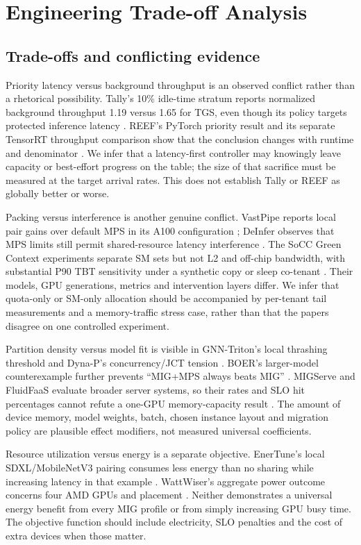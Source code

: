 \documentclass[12pt,a4paper]{article}
\begin{document}
\section{Engineering Trade-off Analysis}
\subsection{Trade-offs and conflicting evidence}
Priority latency versus background throughput is an observed conflict rather than a rhetorical possibility. Tally's 10\% idle-time stratum reports normalized background throughput 1.19 versus 1.65 for TGS, even though its policy targets protected inference latency \cite{tally}. REEF's PyTorch priority result and its separate TensorRT throughput comparison show that the conclusion changes with runtime and denominator \cite{reef}. We infer that a latency-first controller may knowingly leave capacity or best-effort progress on the table; the size of that sacrifice must be measured at the target arrival rates. This does not establish Tally or REEF as globally better or worse.

Packing versus interference is another genuine conflict. VastPipe reports local pair gains over default MPS in its A100 configuration \cite{vastpipe}; DeInfer observes that MPS limits still permit shared-resource latency interference \cite{deinfer}. The SoCC Green Context experiments separate SM sets but not L2 and off-chip bandwidth, with substantial P90 TBT sensitivity under a synthetic copy or sleep co-tenant \cite{interference_deeper}. Their models, GPU generations, metrics and intervention layers differ. We infer that quota-only or SM-only allocation should be accompanied by per-tenant tail measurements and a memory-traffic stress case, rather than that the papers disagree on one controlled experiment.

Partition density versus model fit is visible in GNN-Triton's local thrashing threshold and Dyna-P's concurrency/JCT tension \cite{gnntriton,dynap}. BOER's larger-model counterexample further prevents ``MIG+MPS always beats MIG'' \cite{boer}. MIGServe and FluidFaaS evaluate broader server systems, so their rates and SLO hit percentages cannot refute a one-GPU memory-capacity result \cite{migserve,fluidfaas}. The amount of device memory, model weights, batch, chosen instance layout and migration policy are plausible effect modifiers, not measured universal coefficients.

Resource utilization versus energy is a separate objective. EnerTune's local SDXL/MobileNetV3 pairing consumes less energy than no sharing while increasing latency in that example \cite{enertune}. WattWiser's aggregate power outcome concerns four AMD GPUs and placement \cite{wattwiser}. Neither demonstrates a universal energy benefit from every MIG profile or from simply increasing GPU busy time. The objective function should include electricity, SLO penalties and the cost of extra devices when those matter.
\end{document}
